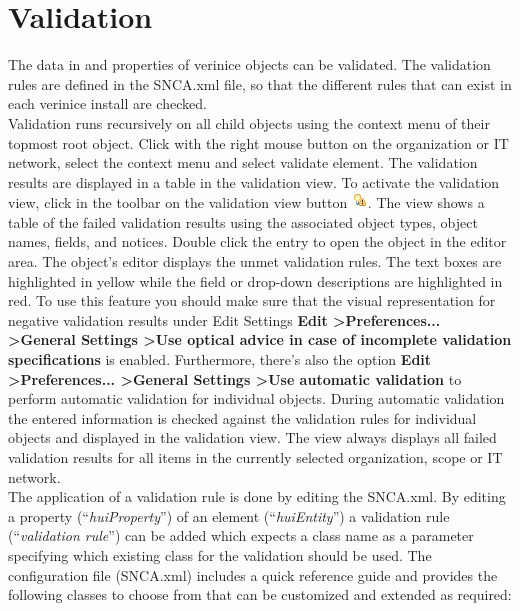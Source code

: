 \documentclass[a4paper,10pt]{book}
\begin{document}
\section{Validation}
The data in and properties of verinice objects can be validated. The validation rules are defined in the SNCA.xml file, so that the different rules that can exist in each verinice install are checked.
\\
Validation runs recursively on all child objects using the context menu of their topmost root object. Click with the right mouse button on the organization or IT network, select the context menu and select validate element.
The validation results are displayed in a table in the validation view.
To activate the validation view, click in the toolbar on the validation view button \includegraphics[height=2ex]{Icon/quickfix_warning_obj.png}. The view shows a table of the failed validation results using the associated object types, object names, fields, and notices. Double click the entry to open the object in the editor area. The object's editor displays the unmet validation rules. The text boxes are highlighted in yellow while the field or drop-down descriptions are highlighted in red. To use this feature you should make sure that the visual representation for negative validation results under Edit Settings \textbf{Edit \textgreater Preferences... \textgreater General Settings \textgreater Use optical advice in case of incomplete validation specifications} is enabled.
Furthermore, there's also the option \textbf{Edit
\textgreater Preferences... \textgreater General Settings \textgreater Use automatic validation} to perform automatic validation for individual objects.
During automatic validation the entered information is checked against the validation rules for individual objects and displayed in the validation view.
The view always displays all failed validation results for all items in the currently selected organization, scope or IT network.
\newline\\
The application of a validation rule is done by editing the SNCA.xml.
By editing a property (``\textit{huiProperty}'') of an element (``\textit{huiEntity}'')
a validation rule (``\textit{validation rule}'') can be added which expects a class name as a parameter specifying which existing class for the validation should be used. The configuration file (SNCA.xml) includes a quick reference guide and provides the following classes to choose from that can be customized and extended as required:
\end{document}
